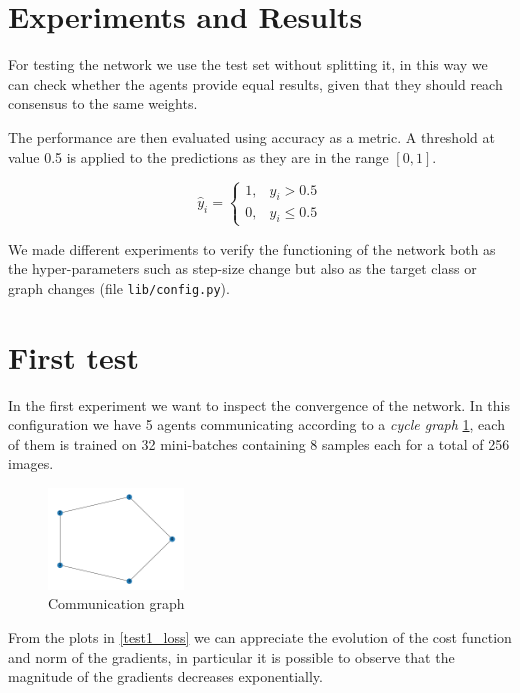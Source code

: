 \documentclass[a4paper,11pt,oneside]{book}
\begin{document}
\section{Experiments and Results}
For testing the network we use the test set without splitting it, in this way we can check whether the agents provide equal results, given that they should reach consensus to the same weights. 

\bigskip
The performance are then evaluated using accuracy as a metric. A threshold at value 0.5 is applied to the predictions as they are in the range $[0, 1]$.

\begin{equation}
\hat{y}_i = 
\begin{cases}
1, & \hat{y}_i > 0.5 \\
0, & \hat{y}_i \le 0.5
\end{cases}
\end{equation}

We made different experiments to verify the functioning of the network both as the hyper-parameters such as step-size change but also as the target class or graph changes (file \texttt{lib/config.py}).

\section{First test}
In the first experiment we want to inspect the convergence of the network. In this configuration we have 5 agents communicating according to a \textit{cycle graph} \ref{test1_graph}, each of them is trained on 32 mini-batches containing 8 samples each for a total of 256 images. 

\begin{figure}[h]
    \centering
    \includegraphics[width=0.32\textwidth]{figs/test1/Graph.png}
    \caption{Communication graph}
    \label{test1_graph}
\end{figure}

From the plots in \ref{test1_loss} we can appreciate the evolution of the cost function and norm of the gradients, in particular it is possible to observe that the magnitude of the gradients decreases exponentially.
\end{document}
